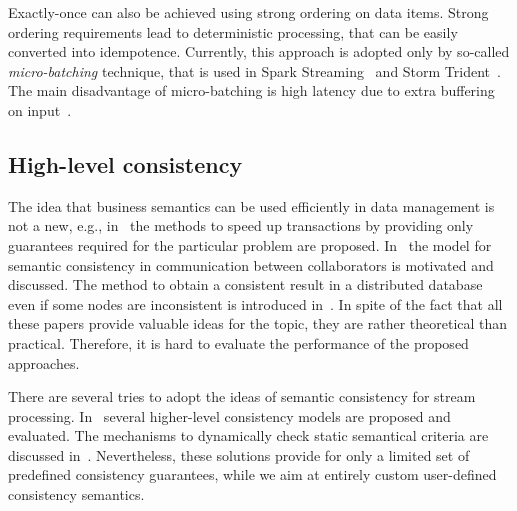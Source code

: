 Exactly-once can also be achieved using strong ordering on data items. Strong ordering requirements lead to deterministic processing, that can be easily converted into idempotence. Currently, this approach is adopted only by so-called {\em micro-batching} technique, that is used in Spark Streaming~\cite{Zaharia:2012:DSE:2342763.2342773} and Storm Trident~\cite{apache:storm:trident}. The main disadvantage of micro-batching is high latency due to extra buffering on input~\cite{S7530084}.

\subsection{High-level consistency}

The idea that business semantics can be used efficiently in data management is not a new, e.g., in~\cite{Garcia-Molina:1983:USK:319983.319985} the methods to speed up transactions by providing only guarantees required for the particular problem are proposed. In~\cite{Guo:2010:CMS:1822018.1822052} the model for semantic consistency in communication between collaborators is motivated and discussed. The method to obtain a consistent result in a distributed database even if some nodes are inconsistent is introduced in~\cite{Rodriguez:2008:ITA:1463434.1463480}. In spite of the fact that all these papers provide valuable ideas for the topic, they are rather theoretical than practical. Therefore, it is hard to evaluate the performance of the proposed approaches.

There are several tries to adopt the ideas of semantic consistency for stream processing. In~\cite{Mihaila:2008:AIO:1458082.1458132} several higher-level consistency models are proposed and evaluated. The mechanisms to dynamically check static semantical criteria are discussed in~\cite{Fischer:2010:SSP:1739041.1739068}. Nevertheless, these solutions provide for only a limited set of predefined consistency guarantees, while we aim at entirely custom user-defined consistency semantics.  